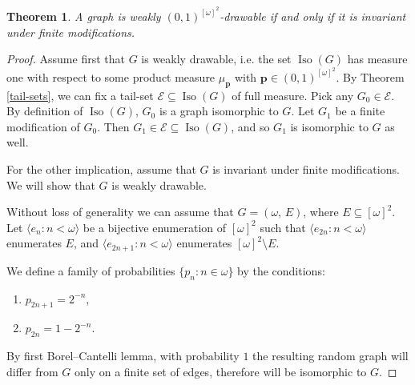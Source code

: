 \documentclass{amsart}
\newtheorem{theorem}{Theorem}[section]
\theoremstyle{plain}
\theoremstyle{definition}
\theoremstyle{remark}
\numberwithin{equation}{section}
\DeclareMathOperator{\iso}{Iso}
\newcommand{\s}{\subseteq}
\begin{document}
\begin{theorem}\label{t:CharGrafLos1}
    A graph is weakly $(0,1)^{[\omega]^2}$-drawable if and only if it is invariant under finite modifications.
\end{theorem}


\begin{proof}

Assume first that $G$ is weakly drawable, i.e. the set $\iso(G)$ has measure one with respect to some product measure $\mu_\mathbf{p}$ with $\textbf{p}\in(0,1)^{[\omega]^2}$. By Theorem \ref{tail-sets}, we can fix a tail-set $\mathcal{E} \s \iso(G)$ of full measure. Pick any $G_0 \in \mathcal{E}$. By definition of $\iso(G)$, $G_0$ is a graph isomorphic to $G$. Let $G_1$ be a finite modification of $G_0$. Then $G_1 \in \mathcal{E} \s \iso(G)$, and so $G_1$ is isomorphic to $G$ as well.

For the other implication, assume that $G$ is invariant under finite modifications. We will show that $G$ is weakly drawable.

Without loss of generality we can assume that $G=(\omega,\, E)$, where $E\s [\omega]^2$. Let $\langle e_n : n<\omega \rangle$ be a bijective enumeration of $[\omega]^2$ such that $\langle e_{2n} : n<\omega \rangle$ enumerates $E$, and $\langle e_{2n+1} : n<\omega \rangle$ enumerates $[\omega]^2 \setminus E$.

We define a family of probabilities $\{p_n : n \in \omega\}$ by the conditions:

\begin{enumerate}
    \item $p_{2n+1}= 2^{-n}$,
    \item $p_{2n}=1-2^{-n}$.
\end{enumerate}

By first Borel--Cantelli lemma, with probability $1$ the resulting random graph  will differ from $G$ only on a finite set of edges, therefore will be isomorphic to $G$.
\end{proof}
\end{document}
